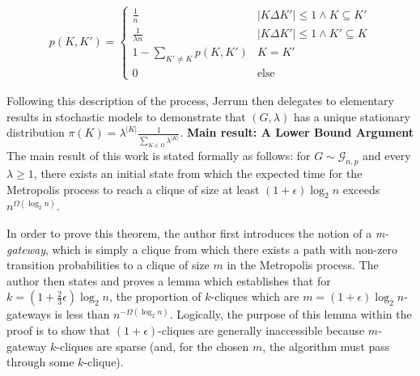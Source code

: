 \documentclass{article}
\theoremstyle{definition}
\begin{document}
\begin{align*}
p(K,K') = \begin{cases}
\frac{1}{n} & \lvert K \Delta K' \rvert \leq 1 \land K \subseteq K' \\
\frac{1}{\lambda n} & \lvert K \Delta K' \rvert \leq 1 \land K' \subseteq K \\
1 - \sum_{K' \neq K} p(K,K') & K = K' \\
0 & \text{else}
\end{cases}
\end{align*}

Following this description of the process, Jerrum then delegates to elementary results 
in stochastic models to demonstrate that $(G,\lambda)$ has a unique stationary distribution 
$\pi(K) = \lambda^{\lvert K \rvert} \frac{1}{\sum_{K \in \Omega} \lambda^{\lvert K \rvert}}$.
\newline\newline
\noindent \textbf{Main result: A Lower Bound Argument } The main result of this work 
is stated formally as follows: for $G \sim \mathcal{G}_{n,p}$ and every $\lambda \geq 1$, there 
exists an initial state from which the expected time for the Metropolis process to reach a 
clique of size at least $(1+\epsilon) \log_2{n}$ exceeds $n^{\Omega(\log_2{n})}$.  

In order to prove this theorem, the author first introduces the notion of a \textit{m-gateway}, which is simply a clique from which there exists a path with non-zero transition probabilities to a clique of size $m$ in the Metropolis process.  The author then states and proves a lemma which establishes that for $k=(1+\frac{2}{3}\epsilon)\log_2{n}$, the proportion of $k$-cliques which are $m=(1+\epsilon)\log_2{n}$-gateways is less than $n^{-\Omega(\log_2{n})}$.  Logically, the purpose of this lemma within the proof is to show 
that $(1+\epsilon)$-cliques are generally inaccessible because $m$-gateway $k$-cliques are sparse
(and, for the chosen $m$, the algorithm must pass through some $k$-clique).
\end{document}
